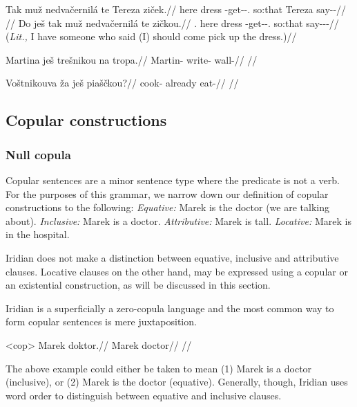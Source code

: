 \pex
\a\begingl
    \gla Tak mu\v{z} nedva\v{c}ernil\'a te Tereza zi\v{c}ek.//
    \glb here dress \Caus{}-get-\Pv{}-\Subj{}.\Ipf{} so:that Tereza say-\Av{}-\Pf{}//
    \glft {}//
  \endgl
\a\begingl
    \gla Do je\v{s} tak mu\v{z} nedva\v{c}ernil\'a te zi\v{c}kou.//
    \glb \First{}\Sg{}.\Pat{} \Exst{} here dress \Caus{}-get-\Pv{}-\Subj{}.\Ipf{} so:that say-\Av{}-\Pf{}-\Nz{}//
    \glft {} (\emph{Lit.,} I have someone who said (I) should come pick up the dress.)//
  \endgl
\xe


\pex
\begingl
\gla Martina ješ trešnikou na tropa.//
\glb Martin-\Pat{} \Exst{} write- \Loc{} wall-\Pat{}//
\glft {}//
\endgl
\xe

\pex
\begingl
\gla Voštnikouva \v{z}a ješ piaščkou?//
\glb cook- already \Exst{} eat-//
\glft {}//
\endgl
\xe

\subsection{Copular constructions}
\subsubsection{Null copula}

Copular sentences are a minor sentence type where the predicate is not a verb. For the purposes of this grammar, we narrow down our definition of copular constructions to the following:
\pex
\a \textit{Equative:} Marek is the doctor (we are talking about).
\a \textit{Inclusive:} Marek is a doctor.
\a \textit{Attributive:} Marek is tall.
\a \textit{Locative:} Marek is in the hospital.
\xe

Iridian does not make a distinction between equative, inclusive and attributive clauses. Locative clauses on the other hand, may be expressed using a copular or an existential construction, as will be discussed in this section.

Iridian is a superficially a zero-copula language and the most common way to form copular sentences is mere juxtaposition.

\pex<cop>
\begingl
\gla Marek doktor.//
\glb Marek doctor//
\glft {}//
\endgl
\xe

The above example could either be taken to mean (1) Marek is a doctor (inclusive), or (2) Marek is the doctor (equative). Generally, though, Iridian uses word order to distinguish between equative and inclusive clauses.

